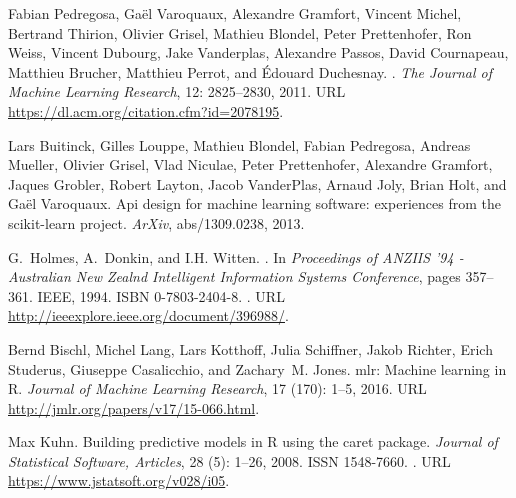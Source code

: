 \documentclass{article}
\begin{document}
\begin{thebibliography}{18}  
Fabian Pedregosa, Ga{\"{e}}l Varoquaux, Alexandre Gramfort, Vincent Michel,
  Bertrand Thirion, Olivier Grisel, Mathieu Blondel, Peter Prettenhofer, Ron
  Weiss, Vincent Dubourg, Jake Vanderplas, Alexandre Passos, David Cournapeau,
  Matthieu Brucher, Matthieu Perrot, and {\'{E}}douard Duchesnay.
.
\newblock \emph{The Journal of Machine Learning Research}, 12:
  2825--2830, 2011.
\newblock URL \url{https://dl.acm.org/citation.cfm?id=2078195}.

Lars Buitinck, Gilles Louppe, Mathieu Blondel, Fabian Pedregosa, Andreas
  Mueller, Olivier Grisel, Vlad Niculae, Peter Prettenhofer, Alexandre
  Gramfort, Jaques Grobler, Robert Layton, Jacob VanderPlas, Arnaud Joly, Brian
  Holt, and Ga{\"e}l Varoquaux.
\newblock Api design for machine learning software: experiences from the
  scikit-learn project.
\newblock \emph{ArXiv}, abs/1309.0238, 2013.

G.~Holmes, A.~Donkin, and I.H. Witten.
.
\newblock In \emph{Proceedings of ANZIIS '94 - Australian New Zealnd
  Intelligent Information Systems Conference}, pages 357--361. IEEE, 1994.
\newblock ISBN 0-7803-2404-8.
\newblock {}.
\newblock URL \url{http://ieeexplore.ieee.org/document/396988/}.

Bernd Bischl, Michel Lang, Lars Kotthoff, Julia Schiffner, Jakob Richter, Erich
  Studerus, Giuseppe Casalicchio, and Zachary~M. Jones.
\newblock mlr: Machine learning in {R}.
\newblock \emph{Journal of Machine Learning Research}, 17
  (170): 1--5, 2016.
\newblock URL \url{http://jmlr.org/papers/v17/15-066.html}.

Max Kuhn.
\newblock Building predictive models in {R} using the caret package.
\newblock \emph{Journal of Statistical Software, Articles}, 28
  (5): 1--26, 2008.
\newblock ISSN 1548-7660.
\newblock {}.
\newblock URL \url{https://www.jstatsoft.org/v028/i05}.


\end{thebibliography}
\end{document}
